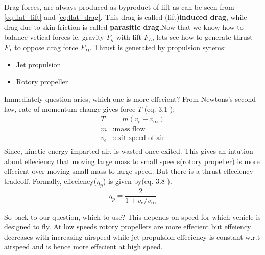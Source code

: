 Drag forces, are always produced as byproduct of lift as can be seen from \eqref{eq:flat_lift} and \eqref{eq:flat_drag}. This drag is called (lift)\textbf{induced drag}, while drag due to skin friction is called \textbf{parasitic drag}.Now that we know how to balance vetical forces ie. gravity $F_g$ with lift $F_L$, lets see how to generate thrust $F_T$ to oppose drag force $F_D$. Thrust is generated by propulsion sytems:
\begin{itemize}
\item Jet propulsion
\item Rotory propeller
\end{itemize}
Immediately question aries, which one is more effecient? From Newtons's second law, rate of momentum change gives force $T$ (eq. 3.1 \cite{anderson1999aircraft}):
\begin{align*}
    T&=\dot{m}(v_e - v_\infty)\\
    \dot{m}&:\text{mass flow}\\
    v_e&: \text{exit speed of air}\\
\end{align*}
Since, kinetic energy imparted air, is wasted once exited. This gives an intution about effeciency that moving large mass to small speeds(rotory propeller) is more effecient over moving small mass to large speed. But there is a thrust effeciency tradeoff. Formally, effeciency($\eta_p$) is given by(eq. 3.8 \cite{anderson1999aircraft}).
 \begin{equation*}
     \eta_p = \frac{2}{1+v_e/v_\infty}
 \end{equation*}

So back to our question, which to use? This depends on speed for which vehicle is designed to fly. At low speeds rotory propellers are more effecient but effeiency decreases with increasing airspeed while jet propulsion effeciency is constant w.r.t airspeed and is hence more effecient at high speed.

